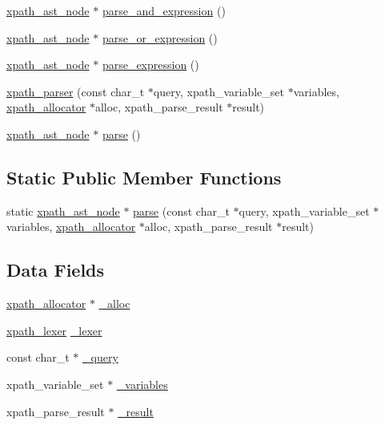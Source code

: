 \begin{DoxyCompactItemize}
\item 
\hyperlink{classxpath__ast__node}{xpath\_\-ast\_\-node} $\ast$ \hyperlink{structxpath__parser_a84bbefffccb9fe91fec5c82aba2b6f02}{parse\_\-and\_\-expression} ()
\item 
\hyperlink{classxpath__ast__node}{xpath\_\-ast\_\-node} $\ast$ \hyperlink{structxpath__parser_a44768d5969dfb9b0a44e845551813c77}{parse\_\-or\_\-expression} ()
\item 
\hyperlink{classxpath__ast__node}{xpath\_\-ast\_\-node} $\ast$ \hyperlink{structxpath__parser_adb814ff3b99621d2a1c8e788ffd1c1c5}{parse\_\-expression} ()
\item 
\hyperlink{structxpath__parser_a3f5b4a04f4d0a0a44962d9825a86ed0d}{xpath\_\-parser} (const char\_\-t $\ast$query, xpath\_\-variable\_\-set $\ast$variables, \hyperlink{classxpath__allocator}{xpath\_\-allocator} $\ast$alloc, xpath\_\-parse\_\-result $\ast$result)
\item 
\hyperlink{classxpath__ast__node}{xpath\_\-ast\_\-node} $\ast$ \hyperlink{structxpath__parser_a581e576958037e1ab682fb952b3ada38}{parse} ()
\end{DoxyCompactItemize}
\subsection*{Static Public Member Functions}
\begin{DoxyCompactItemize}
\item 
static \hyperlink{classxpath__ast__node}{xpath\_\-ast\_\-node} $\ast$ \hyperlink{structxpath__parser_ab865a9a777b466365b3c4bd50290189d}{parse} (const char\_\-t $\ast$query, xpath\_\-variable\_\-set $\ast$variables, \hyperlink{classxpath__allocator}{xpath\_\-allocator} $\ast$alloc, xpath\_\-parse\_\-result $\ast$result)
\end{DoxyCompactItemize}
\subsection*{Data Fields}
\begin{DoxyCompactItemize}
\item 
\hyperlink{classxpath__allocator}{xpath\_\-allocator} $\ast$ \hyperlink{structxpath__parser_ac34f5b21ef406bec944286eee2f45836}{\_\-alloc}
\item 
\hyperlink{classxpath__lexer}{xpath\_\-lexer} \hyperlink{structxpath__parser_a50106db584946e67acd080ef5391a0f4}{\_\-lexer}
\item 
const char\_\-t $\ast$ \hyperlink{structxpath__parser_aaf5ea5d5be97cdd93adc7a719d8edc1c}{\_\-query}
\item 
xpath\_\-variable\_\-set $\ast$ \hyperlink{structxpath__parser_a3e0adfea7cc81c08b97ee1375831df6c}{\_\-variables}
\item 
xpath\_\-parse\_\-result $\ast$ \hyperlink{structxpath__parser_a9370fb875bfc49ca6e35f3165ecb1692}{\_\-result}
\end{DoxyCompactItemize}


